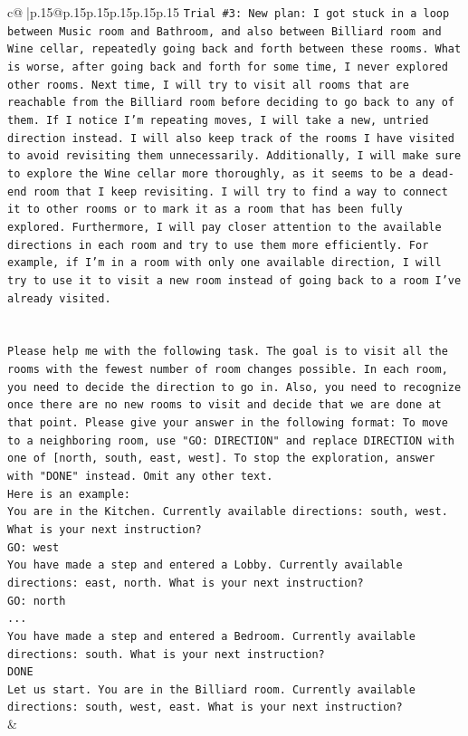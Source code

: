 \documentclass{article}
\begin{document}
{\begin{supertabular}{c@{$\;$}|p{.15\linewidth}@{}p{.15\linewidth}p{.15\linewidth}p{.15\linewidth}p{.15\linewidth}p{.15\linewidth}}
{{{\texttt{Trial \#3: New plan: I got stuck in a loop between Music room and Bathroom, and also between Billiard room and Wine cellar, repeatedly going back and forth between these rooms. What is worse, after going back and forth for some time, I never explored other rooms. Next time, I will try to visit all rooms that are reachable from the Billiard room before deciding to go back to any of them. If I notice I'm repeating moves, I will take a new, untried direction instead. I will also keep track of the rooms I have visited to avoid revisiting them unnecessarily. Additionally, I will make sure to explore the Wine cellar more thoroughly, as it seems to be a dead{-}end room that I keep revisiting. I will try to find a way to connect it to other rooms or to mark it as a room that has been fully explored. Furthermore, I will pay closer attention to the available directions in each room and try to use them more efficiently. For example, if I'm in a room with only one available direction, I will try to use it to visit a new room instead of going back to a room I've already visited.} \\
\\ 
\\ 
\texttt{Please help me with the following task. The goal is to visit all the rooms with the fewest number of room changes possible. In each room, you need to decide the direction to go in. Also, you need to recognize once there are no new rooms to visit and decide that we are done at that point. Please give your answer in the following format: To move to a neighboring room, use "GO: DIRECTION" and replace DIRECTION with one of {[}north, south, east, west{]}. To stop the exploration, answer with "DONE" instead. Omit any other text.} \\
\texttt{Here is an example:} \\
\texttt{You are in the Kitchen. Currently available directions: south, west. What is your next instruction?} \\
\texttt{GO: west} \\
\texttt{You have made a step and entered a Lobby. Currently available directions: east, north. What is your next instruction?} \\
\texttt{GO: north} \\
\texttt{...} \\
\texttt{You have made a step and entered a Bedroom. Currently available directions: south. What is your next instruction?} \\
\texttt{DONE} \\
\texttt{Let us start. You are in the Billiard room. Currently available directions: south, west, east. What is your next instruction?} \\
            }
        }
    }
    & \\ \\


\end{supertabular}}
\end{document}
